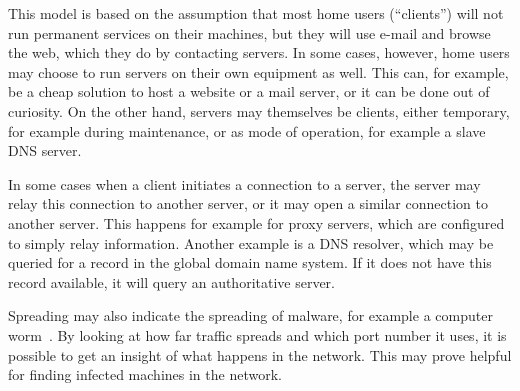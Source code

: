 This model is based on the assumption that most home users (``clients'') will not run permanent services on their machines,
 but they will use e-mail and browse the web, which they do by contacting servers.
In some cases, however, home users may choose to run servers on their own equipment as well.
This can, for example, be a cheap solution to host a website or a mail server, or it can be done out of curiosity.
On the other hand, servers may themselves be clients, either temporary, for example during maintenance, or as mode of operation, for example a slave DNS server.

In some cases when a client initiates a connection to a server,
 the server may relay this connection to another server, or it may open a similar connection to another server.
This happens for example for proxy servers, which are configured to simply relay information.
Another example is a DNS resolver, which may be queried for a record in the global domain name system.
If it does not have this record available, it will query an authoritative server.

Spreading may also indicate the spreading of malware, for example a computer worm~\cite{pastor2001epidemic}.
By looking at how far traffic spreads and which port number it uses,
 it is possible to get an insight of what happens in the network.
This may prove helpful for finding infected machines in the network.

